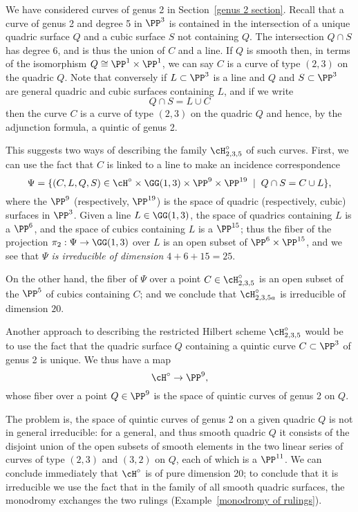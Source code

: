 We have considered curves of genus 2 in Section~\ref{genus 2 section}.  Recall that a curve of genus 2 and degree 5 in 
$\PP^3$ is contained in the intersection of a unique quadric surface $Q$ and a cubic surface $S$ not containing $Q$.
The intersection $Q\cap S$
has degree 6, and is thus the union of $C$ and a line. If $Q$ is smooth then, in terms of the isomorphism $Q \cong \PP^1 \times \PP^1$, we can say $C$ is a curve of type $(2,3)$ on the quadric $Q$. Note that conversely if $L \subset \PP^3$ is a line and $Q$ and $S \subset \PP^3$ are general quadric and cubic surfaces containing $L$, and if we write
$$
Q \cap S = L \cup C
$$ 
then the curve $C$ is a curve of type $(2,3)$ on the quadric $Q$ and hence, by the adjunction formula,
 a quintic of genus 2.

This suggests two ways of describing the family $\cH^\circ_{2,3,5}$ of such curves. First, we can use the fact that $C$ is linked to a line to make an incidence correspondence
$$
\Psi = \{ (C, L, Q, S) \in \cH^\circ \times \GG(1,3) \times \PP^9 \times \PP^{19} \; \mid \; Q \cap S = C \cup L \},
$$
where the $\PP^9$ (respectively, $\PP^{19}$) is the space of quadric (respectively, cubic) surfaces in $\PP^3$. Given a line $L \in \GG(1,3)$, the space of quadrics containing $L$ is a $\PP^6$, and the space of cubics containing $L$ is a $\PP^{15}$; thus the fiber of the projection $\pi_2 : \Psi \to \GG(1,3)$ over $L$ is an open subset of $\PP^6 \times \PP^{15}$, and we see that \emph{$\Psi$ is irreducible of dimension $4 + 6 + 15 = 25$}.

On the other hand, the fiber of $\Psi$ over a point $C \in \cH^\circ_{2,3,5}$ is an open subset of the $\PP^5$ of cubics containing $C$; and we conclude that $\cH^\circ_{2,3,5a}$ is irreducible of dimension $20$.


Another approach to describing the restricted Hilbert scheme $\cH^\circ_{2,3,5}$ would be to use the fact that the quadric surface $Q$ containing a quintic curve $C \subset \PP^3$ of genus 2 is unique. We thus have a map
$$
\cH^\circ \to \PP^9,
$$
whose fiber over a point $Q \in \PP^9$ is the space of quintic curves of genus 2 on $Q$. 

The problem is, the space of quintic curves of genus 2 on a given quadric $Q$ is not in general irreducible: for a general, and thus smooth quadric $Q$ it consists of the disjoint union of the open subsets of smooth elements in the two linear series of curves of type $(2,3)$ and $(3,2)$ on $Q$, each of which is a $\PP^{11}$. We can conclude immediately that $\cH^\circ$ is of pure dimension 20; to conclude that it is irreducible we use the fact that in the family of all smooth quadric surfaces, the monodromy exchanges the two rulings (Example~\ref{monodromy of rulings}).


